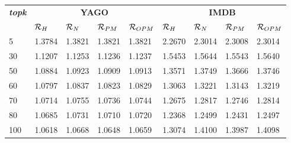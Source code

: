 \begin{tabular}{|l|llll|llll|}
\hline
       \multirow{2}{*}{\textbf{\textit{topk}}}                    & \multicolumn{4}{c|}{\textbf{YAGO}}        & \multicolumn{4}{c|}{\textbf{IMDB}}      \\ \cline{2-9} 
 & $\mathcal{R}_{H}$ & $\mathcal{R}_{N}$ & $\mathcal{R}_{PM}$ & $\mathcal{R}_{OPM}$ & $\mathcal{R}_{H}$ & $\mathcal{R}_{N}$ & $\mathcal{R}_{PM}$ & $\mathcal{R}_{OPM}$ \\ \hline
5   & 1.3784 & 1.3821 & 1.3821 & 1.3821 & 2.2670 & 2.3014 & 2.3008 & 2.3014\\ %
30   & 1.1207 & 1.1253 & 1.1236 & 1.1237 & 1.5453 & 1.5644 & 1.5543 & 1.5640\\ %
50   & 1.0884 & 1.0923 & 1.0909 & 1.0913 & 1.3571 & 1.3749 & 1.3666 & 1.3746\\ %
60   & 1.0797 & 1.0837 & 1.0823 & 1.0829 & 1.3063 & 1.3221 & 1.3143 & 1.3219\\ %
70   & 1.0714 & 1.0755 & 1.0736 & 1.0744 & 1.2675 & 1.2817 & 1.2746 & 1.2814\\ %
80   & 1.0685 & 1.0731 & 1.0710 & 1.0720 & 1.2368 & 1.2499 & 1.2431 & 1.2497\\ %
100   & 1.0618 & 1.0668 & 1.0648 & 1.0659 & 1.3074 & 1.4100 & 1.3987 & 1.4098\\ \hline

\end{tabular}

